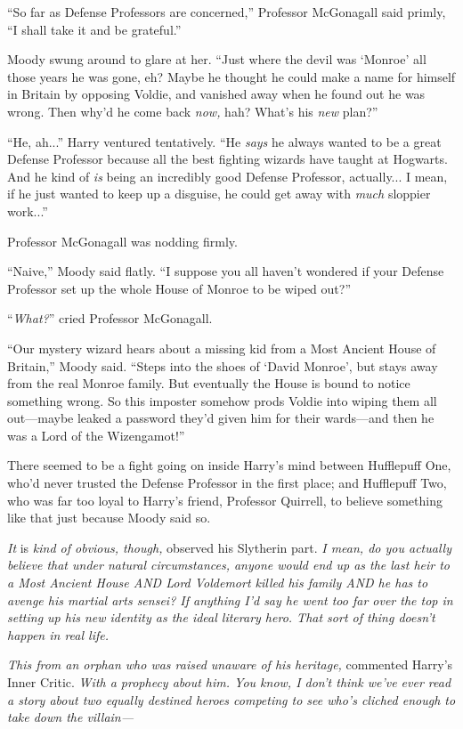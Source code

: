 “So far as Defense Professors are concerned,” Professor McGonagall said primly, “I shall take it and be grateful.”

Moody swung around to glare at her. “Just where the devil was ‘Monroe’ all those years he was gone, eh? Maybe he thought he could make a name for himself in Britain by opposing Voldie, and vanished away when he found out he was wrong. Then why’d he come back \emph{now,} hah? What’s his \emph{new} plan?”

“He, ah...” Harry ventured tentatively. “He \emph{says} he always wanted to be a great Defense Professor because all the best fighting wizards have taught at Hogwarts. And he kind of \emph{is} being an incredibly good Defense Professor, actually... I mean, if he just wanted to keep up a disguise, he could get away with \emph{much} sloppier work...”

Professor McGonagall was nodding firmly.

“Naive,” Moody said flatly. “I suppose you all haven’t wondered if your Defense Professor set up the whole House of Monroe to be wiped out?”

“\emph{What?}” cried Professor McGonagall.

“Our mystery wizard hears about a missing kid from a Most Ancient House of Britain,” Moody said. “Steps into the shoes of ‘David Monroe’, but stays away from the real Monroe family. But eventually the House is bound to notice something wrong. So this imposter somehow prods Voldie into wiping them all out—maybe leaked a password they’d given him for their wards—and then he was a Lord of the Wizengamot!”

There seemed to be a fight going on inside Harry’s mind between Hufflepuff One, who’d never trusted the Defense Professor in the first place; and Hufflepuff Two, who was far too loyal to Harry’s friend, Professor Quirrell, to believe something like that just because Moody said so.

\emph{It} is \emph{kind of obvious, though,} observed his Slytherin part. \emph{I mean, do you actually believe that under natural circumstances, anyone would end up as the last heir to a Most Ancient House AND Lord Voldemort killed his family AND he has to avenge his martial arts sensei? If anything I’d say he went too far over the top in setting up his new identity as the ideal literary hero. That sort of thing doesn’t happen in real life.}

\emph{This from an orphan who was raised unaware of his heritage,} commented Harry’s Inner Critic. \emph{With a prophecy about him. You know, I don’t think we’ve ever read a story about two equally destined heroes competing to see who’s cliched enough to take down the villain—}

